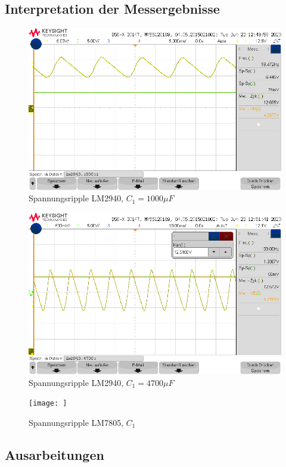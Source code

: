 \subsection{Interpretation der Messergebnisse}
\begin{figure}[H]
    \centering
    \includegraphics[width = \costumPicWidth]{Lab_5/Messungen/lm2940.1000u1.png}
    \caption{Spannungsripple LM2940, $C_1=1000\mu F$}
    \label{fig:V_rip_lm2940_1000u}
\end{figure}

\begin{figure}[H]
    \centering
    \includegraphics[width = \costumPicWidth]{Lab_5/Messungen/lm2940.4700u.png}
    \caption{Spannungsripple LM2940, $C_1=4700\mu F$}
    \label{fig:V_rip_lm2940_1000u}
\end{figure}

\begin{figure}
    \centering
    \texttt{[image: ]}
    \caption{Spannungsripple LM7805, $C_1$}
    \label{fig:my_label}
\end{figure}
\subsection{Ausarbeitungen}
